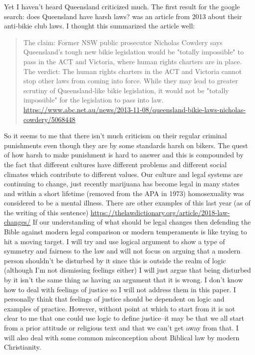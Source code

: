\documentclass[11pt]{article}
\begin{document}
Yet I haven't heard Queensland criticized much. The first result for the google search: does Queensland have harsh laws? was an article from 2013 about their anti-bikie club laws. I thought this summarized the article well:
\begin{quote}
The claim: Former NSW public prosecutor Nicholas Cowdery says Queensland's tough new bikie legislation would be "totally impossible" to pass in the ACT and Victoria, where human rights charters are in place.
The verdict: The human rights charters in the ACT and Victoria cannot stop other laws from coming into force. While they may lead to greater scrutiny of Queensland-like bikie legislation, it would not be "totally impossible" for the legislation to pass into law. \url{https://www.abc.net.au/news/2013-11-08/queensland-bikie-laws-nicholas-cowdery/5068448}
\end{quote}

So it seems to me that there isn't much criticism on their regular criminal punishments even though they are by some standards harsh on bikers. The quest of how harsh to make punishment is hard to answer and this is compounded by the fact that different cultures have different problems and different social climates which contribute to different values. Our culture and legal systems are continuing to change, just recently marijuana has become legal in many states and within a short lifetime (removed from the APA in 1973) homosexuality was considered to be a mental illness. There are other examples of this last year (as of the writing of this sentence) \url{https://thelawdictionary.org/article/2018-law-changes/} If our understanding of what should be legal changes then defending the Bible against modern legal comparison or modern temperaments is like trying to hit a moving target. I will try and use logical argument to show a type of symmetry and fairness to the law and will not focus on arguing that a modern person shouldn't be disturbed by it since this is outside the realm of logic (although I'm not dismissing feelings either) I will just argue that being disturbed by it isn't the same thing as having an argument that it is wrong. I don't know how to deal with feelings of justice so I will not address them in this paper. I personally think that feelings of justice should be dependent on logic and examples of practice. However, without point at which to start from it is not clear to me that one could use logic to define justice--it may be that we all start from a prior attitude or religious text and that we can't get away from that. I will also deal with some common misconception about Biblical law by modern Christianity. 
\end{document}
